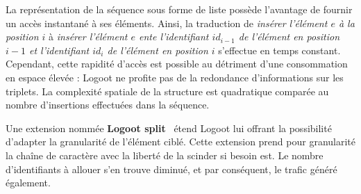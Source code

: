 \noindent La représentation de la séquence sous forme de liste possède
l'avantage de fournir un accès instantané à ses éléments. Ainsi, la traduction
de \emph{insérer l'élément $e$ à la position $i$} à \emph{insérer l'élément $e$
  ente l'identifiant $id_{i-1}$ de l'élément en position $i-1$ et l'identifiant
  $id_i$ de l'élément en position $i$} s'effectue en temps constant.  Cependant,
cette rapidité d'accès est possible au détriment d'une consommation en espace
élevée : Logoot ne profite pas de la redondance d'informations sur les
triplets. La complexité spatiale de la structure est quadratique comparée au
nombre d'insertions effectuées dans la séquence.

\noindent Une extension nommée \textbf{Logoot split}~\cite{andre2013supporting}
étend Logoot lui offrant la possibilité d'adapter la granularité de l'élément
ciblé.  Cette extension prend pour granularité la chaîne de caractère avec la
liberté de la scinder si besoin est. Le nombre d'identifiants à allouer s'en
trouve diminué, et par conséquent, le trafic généré également.


